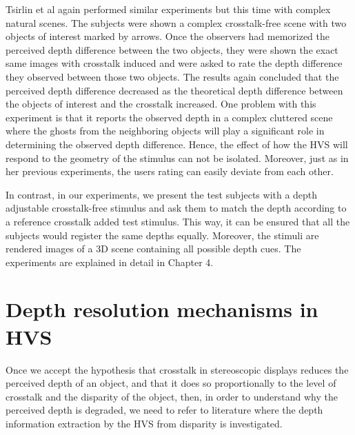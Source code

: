 Tsirlin et al \cite{tsirlin2012crosstalk} again performed similar experiments but this time with complex natural scenes. The subjects were shown a complex crosstalk-free scene with two objects of interest marked by arrows. Once the observers had memorized the perceived depth difference between the two objects, they were shown the exact same images with crosstalk induced and were asked to rate the depth difference they observed between those two objects. The results again concluded that the perceived depth difference decreased as the theoretical depth difference between the objects of interest and the crosstalk increased. One problem with this experiment is that it reports the observed depth in a complex cluttered scene where the ghosts from the neighboring objects will play a significant role in determining the observed depth difference. Hence, the effect of how the HVS will respond to the geometry of the stimulus can not be isolated. Moreover, just as in her previous experiments, the users rating can easily deviate from each other.

In contrast, in our experiments, we present the test subjects with a depth adjustable crosstalk-free stimulus and ask them to match the depth according to a reference crosstalk added test stimulus. This way, it can be ensured that all the subjects would register the same depths equally. Moreover, the stimuli are rendered images of a 3D scene containing all possible depth cues. The experiments are explained in detail in Chapter 4.

\section{Depth resolution mechanisms in HVS}
Once we accept the hypothesis that crosstalk in stereoscopic displays reduces the perceived depth of an object, and that it does so proportionally to the level of crosstalk and the disparity of the object, then, in order to understand why the perceived depth is degraded, we need to refer to literature where the depth information extraction by the HVS from disparity is investigated.

